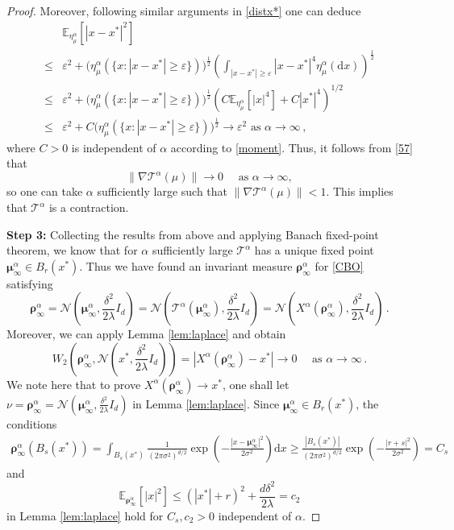 \documentclass[reqno]{amsart}
\numberwithin{algorithm}{section}
\newcommand{\diff}{\mathrm{d}}
\newcommand{\dd}{\mathrm{d}}
\newcommand{\EE}{{\mathbb E}}
\newcommand{\Xalpha}{{X^\alpha}}
\newcommand{\mc}[1]{\mathcal{#1}}
\begin{document}
{\begin{proof}
Moreover, following similar arguments in \eqref{distx*} one can deduce
\begin{align*}
&\EE_{\eta^\alpha_{\mu}}[|x-x^*|^2]\\
    \leq &\varepsilon^2+ \bigg(\eta_{\mu}^\alpha(\{x:|x-x^*|\geq \varepsilon\}) \bigg)^{\frac{1}{2}} \left(\int_{|x-x^*|\geq \varepsilon}|x-x^*|^4\eta_{\mu}^\alpha(\dd x) \right)^{\frac{1}{2}}\\
    \leq&\varepsilon^2 +\bigg(\eta_{\mu}^\alpha(\{x:|x-x^*|\geq \varepsilon\}) \bigg)^{\frac{1}{2}} \left(C\EE_{\eta_\mu^\alpha}\left[|x|^4\right]+C|x^*|^4\right)^{1/2}\\
    \leq & \varepsilon^2 +C\bigg(\eta_{\mu}^\alpha(\{x:|x-x^*|\geq \varepsilon\}) \bigg)^{\frac{1}{2}} \to \varepsilon^2 \mbox{ as }\alpha\to\infty\,,
    \end{align*}
where $C>0$ is independent of $\alpha$ according to \eqref{moment}. Thus, it follows from \eqref{57} that 
\begin{equation}\label{contraction}
     \|\nabla \mathcal{T}^\alpha(\mu)\|\to 0\quad \mbox{ as }\alpha\to\infty,
\end{equation}
so one can take $\alpha$ sufficiently large such that $\|\nabla \mathcal{T}^\alpha(\mu)\|<1$. This implies that $\mathcal{T}^\alpha$ is a contraction.

\textbf{Step 3:}  Collecting the results from above and applying Banach fixed-point theorem, we know that for $\alpha$ sufficiently large $\mathcal{T}^\alpha$ has a unique fixed point $\boldsymbol\mu_\infty^\alpha\in B_r(x^*)$. Thus we have found an invariant measure $\boldsymbol\rho_\infty^\alpha$ for \eqref{CBO} satisfying
$$\boldsymbol\rho_\infty^\alpha=\mc{N}\left(\boldsymbol\mu_\infty^\alpha,\frac{\delta^2}{2\lambda}I_d\right)=\mc{N}\left(\mc{T}^\alpha(\boldsymbol\mu_\infty^\alpha),\frac{\delta^2}{2\lambda}I_d\right)=\mc{N}\left(\Xalpha(\boldsymbol\rho_\infty^\alpha),\frac{\delta^2}{2\lambda}I_d\right)\,.$$
 Moreover, we can apply Lemma \ref{lem:laplace} and obtain
 \begin{equation}
     W_2\left(\boldsymbol\rho_\infty^\alpha, \mc{N}\left(x^*,\frac{\delta^2}{2\lambda}I_d\right)\right)=|\Xalpha(\boldsymbol\rho_\infty^\alpha)- x^*|\to 0\quad \mbox{ as }\alpha\to\infty \,.
 \end{equation}
We note here that to prove $\Xalpha(\boldsymbol\rho_\infty^\alpha)\to x^*$, one shall let $\nu=\boldsymbol\rho_\infty^\alpha=\mc{N}(\boldsymbol\mu_\infty^\alpha,\frac{\delta^2}{2\lambda}I_d)$ in Lemma \ref{lem:laplace}. Since $\boldsymbol\mu_\infty^\alpha\in B_r(x^*)$, the conditions 
\begin{align*}
\boldsymbol\rho_\infty^\alpha(B_s(x^*))=\int_{B_s(x^*)}\frac{1}{(2\pi\sigma^2)^{d/2}}\exp\left(-\frac{|x-\boldsymbol\mu_\infty^\alpha|^2}{2\sigma^2}\right) \diff x\geq \frac{|B_s(x^*)|}{(2\pi\sigma^2)^{d/2}} \exp\left(-\frac{|r+s|^2}{2\sigma^2}\right)=C_s
\end{align*}
and
\begin{equation*}
    \EE_{\boldsymbol\rho_\infty^\alpha}\left[|x|^2\right]\leq (|x^*|+r)^2+\frac{d\delta^2}{2\lambda}=c_2
\end{equation*}
in  Lemma \ref{lem:laplace} hold for $C_s,c_2>0$ independent of $\alpha$.


\end{proof}}
\end{document}
